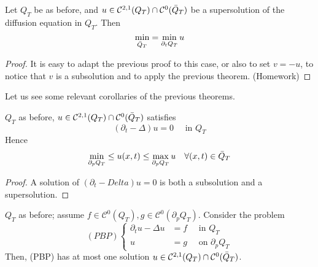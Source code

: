 \begin{ThBox}
    \begin{Th}
        Let $Q_T$ be as before, and $u \in \mathcal{C}^{2,1}(Q_T) \cap \mathcal{C}^0(\Bar{Q}_T)$ be a supersolution of the diffusion equation in $Q_T$. Then
        \begin{equation*}
            \min_{\Bar{Q}_T} = \min_{\partial_t Q_T} u
        \end{equation*}
    \end{Th}
\end{ThBox}
\begin{ProofBox}
    \begin{proof}
        It is easy to adapt the previous proof to this case, or also to set $v=-u$, to notice that $v$ is a subsolution and to apply the previous theorem. (Homework)
    \end{proof}
\end{ProofBox}
Let us see some relevant corollaries of the previous theorems. 
\begin{PropBox}
    \begin{Cor}[Corollary 1]
        \label{cor 1}
        $Q_T$ as before, $u \in \mathcal{C}^{2,1}(Q_T) \cap \mathcal{C}^0(\Bar{Q}_T)$ satisfies 
        \begin{equation*}
            (\partial_t - \Delta) u = 0 \quad \text{ in } Q_T
        \end{equation*}
        Hence
        \begin{equation*}
        \min_{\partial_p Q_T} \leq u(x,t) \leq \max_{\partial_p Q_T} u \quad \forall (x,t) \in \Bar{Q}_T
        \end{equation*}
    \end{Cor}
\end{PropBox}
\begin{ProofBox}
    \begin{proof}
        A solution of $(\partial_t - Delta) u = 0$ is both a subsolution and a supersolution.
    \end{proof}
\end{ProofBox}
\begin{PropBox}
    \begin{Cor}
    \label{cor 2}
        $Q_T$ as before; assume $f \in \mathcal{C}^0 (Q_T), g \in \mathcal{C}^0(\partial_p Q_T)$. Consider the problem
        \begin{equation*}
        (PBP)
            \begin{cases}
                \partial_t u - \Delta u &= f \quad \text{ in } Q_T\\
                u&=g \quad \text{ on } \partial_p Q_T
            \end{cases}
        \end{equation*}
        Then, (PBP) has at most one solution $u \in \mathcal{C}^{2,1}(Q_T) \cap \mathcal{C}^0(\Bar{Q}_T)$.
    \end{Cor}
\end{PropBox}
